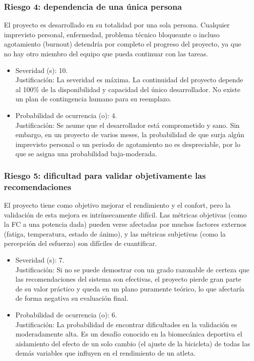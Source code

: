 \documentclass[
11pt, %
]{charter}
\begin{document}
\subsubsection*{Riesgo 4: dependencia de una única persona}

El proyecto es desarrollado en su totalidad por una sola persona. Cualquier imprevisto personal, enfermedad, problema técnico bloqueante o incluso agotamiento (burnout) detendría por completo el progreso del proyecto, ya que no hay otro miembro del equipo que pueda continuar con las tareas.
\begin{itemize}
    \item Severidad (s): 10.\\
    Justificación: La severidad es máxima. La continuidad del proyecto depende al 100\% de la disponibilidad y capacidad del único desarrollador. No existe un plan de contingencia humano para su reemplazo.
    \item Probabilidad de ocurrencia (o): 4.\\
    Justificación: Se asume que el desarrollador está comprometido y sano. Sin embargo, en un proyecto de varios meses, la probabilidad de que surja algún imprevisto personal o un periodo de agotamiento no es despreciable, por lo que se asigna una probabilidad baja-moderada.
\end{itemize}

\subsubsection*{Riesgo 5: dificultad para validar objetivamente las recomendaciones}

El proyecto tiene como objetivo mejorar el rendimiento y el confort, pero la validación de esta mejora es intrínsecamente difícil. Las métricas objetivas (como la FC a una potencia dada) pueden verse afectadas por muchos factores externos (fatiga, temperatura, estado de ánimo), y las métricas subjetivas (como la percepción del esfuerzo) son difíciles de cuantificar.
\begin{itemize}
    \item Severidad (s): 7.\\
    Justificación: Si no se puede demostrar con un grado razonable de certeza que las recomendaciones del sistema son efectivas, el proyecto pierde gran parte de su valor práctico y queda en un plano puramente teórico, lo que afectaría de forma negativa su evaluación final.
    \item Probabilidad de ocurrencia (o): 6.\\
    Justificación: La probabilidad de encontrar dificultades en la validación es moderadamente alta. Es un desafío conocido en la biomecánica deportiva el aislamiento del efecto de un solo cambio (el ajuste de la bicicleta) de todas las demás variables que influyen en el rendimiento de un atleta.
\end{itemize}
\end{document}
